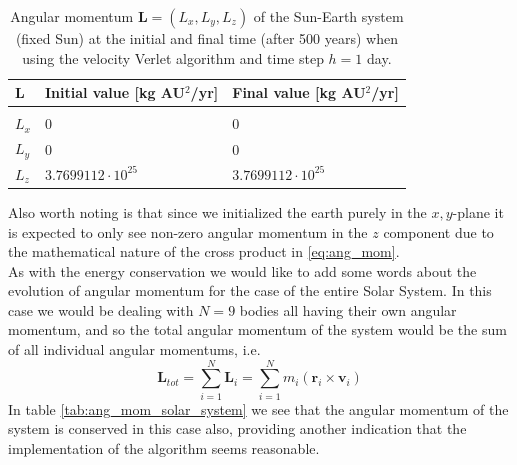 \documentclass[12pt]{article}
\numberwithin{figure}{section}
\numberwithin{table}{section}
\begin{document}
\begin{table}[ht]
\begin{center}
  \begin{tabular}{| l | l | l |}
  \hline
    $\mathbf{L}$ &  Initial value [kg AU$^2$/yr] & Final value [kg AU$^2$/yr]\\[0.10cm]\hline\hline
     & &\\
     $L_x$ & $0$ & $0$\\[0.10cm]
     $L_y$ & $0$ & $0$\\[0.10cm]
     $L_z$ & $3.7699112\cdot 10^{25}$ & $3.7699112\cdot 10^{25}$\\[0.10cm]
     \hline
  \end{tabular}
\end{center}
\caption{Angular momentum $\mathbf{L}=(L_x,L_y,L_z)$ of the Sun-Earth system (fixed Sun) at the initial and final time (after 500 years) when using the velocity Verlet algorithm and time step $h=1$ day.}
\label{tab:ang_mom_earth_sun}
\end{table}

\noindent Also worth noting is that since we initialized the earth purely in the $x,y$-plane it is expected to only see non-zero angular momentum in the $z$ component due to the mathematical nature of the cross product in \eqref{eq:ang_mom}.\\

\noindent As with the energy conservation we would like to add some words about the evolution of angular momentum for the case of the entire Solar System. In this case we would be dealing with $N=9$ bodies all having their own angular momentum, and so the total angular momentum of the system would be the sum of all individual angular momentums, i.e.
\begin{equation}
	\mathbf{L}_{tot}=\sum_{i=1}^N\mathbf{L}_i=\sum_{i=1}^Nm_i(\mathbf{r}_i\times\mathbf{v}_i)
\end{equation}
In table \ref{tab:ang_mom_solar_system} we see that the angular momentum of the system is conserved in this case also,  providing another indication that the implementation of the algorithm seems reasonable.
\end{document}
